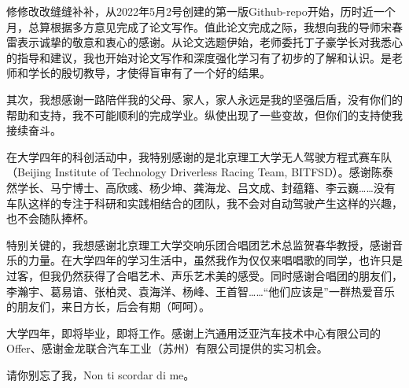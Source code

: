 %
%
%
%
%
%

\renewcommand{\thechapter}{致谢}



修修改改缝缝补补，从2022年5月2号创建的第一版Github-repo开始，历时近一个月，总算根据多方意见完成了论文写作。值此论文完成之际，我想向我的导师宋春雷表示诚挚的敬意和衷心的感谢。从论文选题伊始，老师委托丁子豪学长对我悉心的指导和建议，我也开始对论文写作和深度强化学习有了初步的了解和认识。是老师和学长的殷切教导，才使得盲审有了一个好的结果。

其次，我想感谢一路陪伴我的父母、家人，家人永远是我的坚强后盾，没有你们的帮助和支持，我不可能顺利的完成学业。纵使出现了一些变故，但你们的支持使我接续奋斗。

在大学四年的科创活动中，我特别感谢的是北京理工大学无人驾驶方程式赛车队（Beijing Institute of Technology
Driverless Racing Team, BITFSD）。感谢陈泰然学长、马宁博士、高欣彧、杨少坤、龚海龙、吕文成、封蕴籍、李云巍……没有车队这样的专注于科研和实践相结合的团队，我不会对自动驾驶产生这样的兴趣，也不会随队捧杯。

特别关键的，我想感谢北京理工大学交响乐团合唱团艺术总监贺春华教授，感谢音乐的力量。在大学四年的学习生活中，虽然我作为仅仅来唱唱歌的同学，也许只是过客，但我仍然获得了合唱艺术、声乐艺术美的感受。同时感谢合唱团的朋友们，李瀚宇、葛易谙、张柏灵、袁海洋、杨峰、王首智……“他们应该是”一群热爱音乐的朋友们，来日方长，后会有期（呵呵）。

大学四年，即将毕业，即将工作。感谢上汽通用泛亚汽车技术中心有限公司的Offer、感谢金龙联合汽车工业（苏州）有限公司提供的实习机会。

请你别忘了我，Non ti scordar di me。